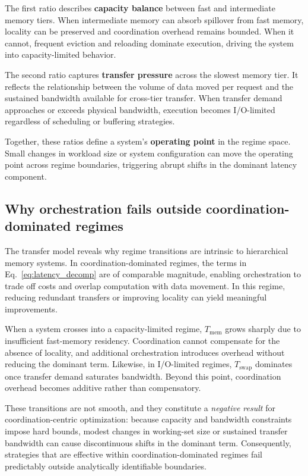 The first ratio describes \textbf{capacity balance} between fast and intermediate memory tiers. When intermediate memory can absorb spillover from fast memory, locality can be preserved and coordination overhead remains bounded. When it cannot, frequent eviction and reloading dominate execution, driving the system into capacity-limited behavior.

The second ratio captures \textbf{transfer pressure} across the slowest memory tier. It reflects the relationship between the volume of data moved per request and the sustained bandwidth available for cross-tier transfer. When transfer demand approaches or exceeds physical bandwidth, execution becomes I/O-limited regardless of scheduling or buffering strategies.

Together, these ratios define a system’s \textbf{operating point} in the regime space. Small changes in workload size or system configuration can move the operating point across regime boundaries, triggering abrupt shifts in the dominant latency component.

\subsection{Why orchestration fails outside coordination-dominated regimes}
The transfer model reveals why regime transitions are intrinsic to hierarchical memory systems. In coordination-dominated regimes, the terms in Eq.~\ref{eq:latency_decomp} are of comparable magnitude, enabling orchestration to trade off costs and overlap computation with data movement. In this regime, reducing redundant transfers or improving locality can yield meaningful improvements.

When a system crosses into a capacity-limited regime, $T_{\mathrm{mem}}$ grows sharply due to insufficient fast-memory residency. Coordination cannot compensate for the absence of locality, and additional orchestration introduces overhead without reducing the dominant term. Likewise, in I/O-limited regimes, $T_{\mathrm{swap}}$ dominates once transfer demand saturates bandwidth. Beyond this point, coordination overhead becomes additive rather than compensatory.

These transitions are not smooth, and they constitute a \emph{negative result} for coordination-centric optimization: because capacity and bandwidth constraints impose hard bounds, modest changes in working-set size or sustained transfer bandwidth can cause discontinuous shifts in the dominant term. Consequently, strategies that are effective within coordination-dominated regimes fail predictably outside analytically identifiable boundaries.

